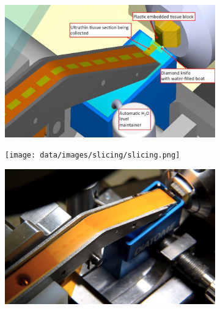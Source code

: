 \begin{figure}[htpb]
	\newcommand{\mywidth}{0.44\textwidth}
	\centering
	\begin{subfigure}[b]{\mywidth}
		\centering
		\includegraphics[width=\textwidth]{data/images/slicing/slicing_diagram.png}
		\caption{\label{fig:slicing_diagram}}
	\end{subfigure}
	\hspace{3mm}
	\begin{subfigure}[b]{\mywidth}
		\centering
		\texttt{[image: data/images/slicing/slicing.png]}
		\caption{\label{fig:slicing}}
	\end{subfigure}
	\hspace{3mm}
	\begin{subfigure}[b]{\mywidth}
		\centering
		\includegraphics[width=\textwidth]{data/images/slicing/slicing_close.png}
		\caption{\label{fig:slicing_close}}
	\end{subfigure}
	\hspace{3mm}

\end{figure}

